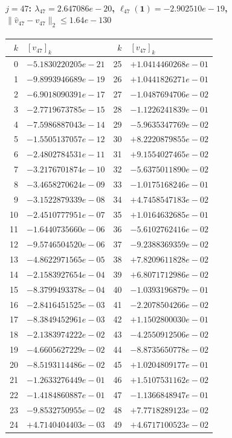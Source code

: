 \documentclass[11pt]{article}
\begin{document}
\paragraph{$j = 47$: $\lambda_{47} = 2.647086e-20$, \quad $\ell_{47}(\mathbf{1}) = -2.902510e-19$, \quad $\|\hat{v}_{47} - v_{47}\|_2 \leq 1.64e-130$}
\begin{center}
{\footnotesize
\begin{tabular}{r@{\;\;}l@{\quad}r@{\;\;}l}
\toprule
$k$ & $[v_{47}]_k$ & $k$ & $[v_{47}]_k$ \\
\midrule
0 & $-5.1830220205e-21$ & 25 & $+1.0414460268e-01$ \\
1 & $-9.8993946689e-19$ & 26 & $+1.0441826271e-01$ \\
2 & $-6.9018090391e-17$ & 27 & $-1.0487694706e-02$ \\
3 & $-2.7719673785e-15$ & 28 & $-1.1226241839e-01$ \\
4 & $-7.5986887043e-14$ & 29 & $-5.9635347769e-02$ \\
5 & $-1.5505137057e-12$ & 30 & $+8.2220879855e-02$ \\
6 & $-2.4802784531e-11$ & 31 & $+9.1554027465e-02$ \\
7 & $-3.2176701874e-10$ & 32 & $-5.6375011890e-02$ \\
8 & $-3.4658270624e-09$ & 33 & $-1.0175168246e-01$ \\
9 & $-3.1522879339e-08$ & 34 & $+4.7458547183e-02$ \\
10 & $-2.4510777951e-07$ & 35 & $+1.0164632685e-01$ \\
11 & $-1.6440735660e-06$ & 36 & $-5.6102762416e-02$ \\
12 & $-9.5746504520e-06$ & 37 & $-9.2388369359e-02$ \\
13 & $-4.8622971565e-05$ & 38 & $+7.8209611828e-02$ \\
14 & $-2.1583927654e-04$ & 39 & $+6.8071712986e-02$ \\
15 & $-8.3799493378e-04$ & 40 & $-1.0393196879e-01$ \\
16 & $-2.8416451525e-03$ & 41 & $-2.2078504266e-02$ \\
17 & $-8.3849452961e-03$ & 42 & $+1.1502800030e-01$ \\
18 & $-2.1383974222e-02$ & 43 & $-4.2550912506e-02$ \\
19 & $-4.6605627229e-02$ & 44 & $-8.8735650778e-02$ \\
20 & $-8.5193114486e-02$ & 45 & $+1.0204809177e-01$ \\
21 & $-1.2633276449e-01$ & 46 & $+1.5107531162e-02$ \\
22 & $-1.4184860887e-01$ & 47 & $-1.1366848947e-01$ \\
23 & $-9.8532750955e-02$ & 48 & $+7.7718289123e-02$ \\
24 & $+4.7140404403e-03$ & 49 & $+4.6717100523e-02$ \\
\bottomrule
\end{tabular}
}
\end{center}
\end{document}
